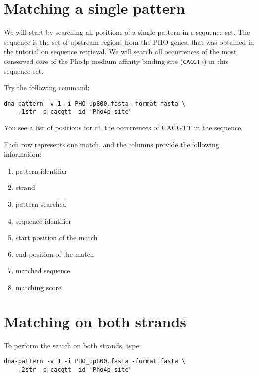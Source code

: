 \section{Matching a single pattern}

We will start by searching all positions of a single pattern in a
sequence set. The sequence is the set of upstream regions from the PHO
genes, that was obtained in the tutorial on sequence retrieval. We
will search all occurrences of the most conserved core of the Pho4p
medium affinity binding site (\texttt{CACGTT}) in this sequence set.

Try the following command:

{\color{Blue} \begin{footnotesize} 
\begin{verbatim}
dna-pattern -v 1 -i PHO_up800.fasta -format fasta \ 
    -1str -p cacgtt -id 'Pho4p_site'
\end{verbatim} \end{footnotesize}
}

You see a list of positions for all the occurrences of CACGTT in the sequence.

Each row represents one match, and the columns provide the following
information:
\begin{enumerate}
\item pattern identifier
\item strand
\item pattern searched
\item sequence identifier
\item start position of the match
\item end position of the match
\item matched sequence
\item matching score
\end{enumerate}

\section{Matching on both strands}

To perform the search on both strands, type:
{\color{Blue} \begin{footnotesize} 
\begin{verbatim}
dna-pattern -v 1 -i PHO_up800.fasta -format fasta \ 
    -2str -p cacgtt -id 'Pho4p_site'
\end{verbatim} \end{footnotesize}
}

